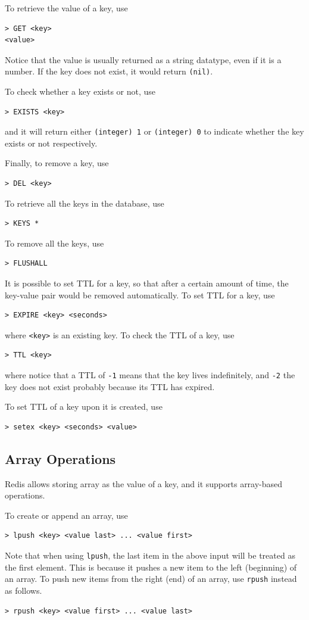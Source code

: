 To retrieve the value of a key, use
\begin{lstlisting}
> GET <key>
<value>
\end{lstlisting}
Notice that the value is usually returned as a string datatype, even if it is a number. If the key does not exist, it would return \verb|(nil)|.

To check whether a key exists or not, use
\begin{lstlisting}
> EXISTS <key>
\end{lstlisting}
and it will return either \verb|(integer) 1| or \verb|(integer) 0| to indicate whether the key exists or not respectively.

Finally, to remove a key, use
\begin{lstlisting}
> DEL <key>
\end{lstlisting}

To retrieve all the keys in the database, use
\begin{lstlisting}
> KEYS *
\end{lstlisting}

To remove all the keys, use
\begin{lstlisting}
> FLUSHALL
\end{lstlisting}

It is possible to set TTL for a key, so that after a certain amount of time, the key-value pair would be removed automatically. To set TTL for a key, use
\begin{lstlisting}
> EXPIRE <key> <seconds>
\end{lstlisting}
where \verb|<key>| is an existing key. To check the TTL of a key, use
\begin{lstlisting}
> TTL <key>
\end{lstlisting}
where notice that a TTL of \verb|-1| means that the key lives indefinitely, and \verb|-2| the key does not exist probably because its TTL has expired. 

To set TTL of a key upon it is created, use
\begin{lstlisting}
> setex <key> <seconds> <value>
\end{lstlisting}

\subsection{Array Operations}

Redis allows storing array as the value of a key, and it supports array-based operations.

To create or append an array, use
\begin{lstlisting}
> lpush <key> <value last> ... <value first>
\end{lstlisting}
Note that when using \verb|lpush|, the last item in the above input will be treated as the first element. This is because it pushes a new item to the left (beginning) of an array. To push new items from the right (end) of an array, use \verb|rpush| instead as follows.
\begin{lstlisting}
> rpush <key> <value first> ... <value last>
\end{lstlisting}

